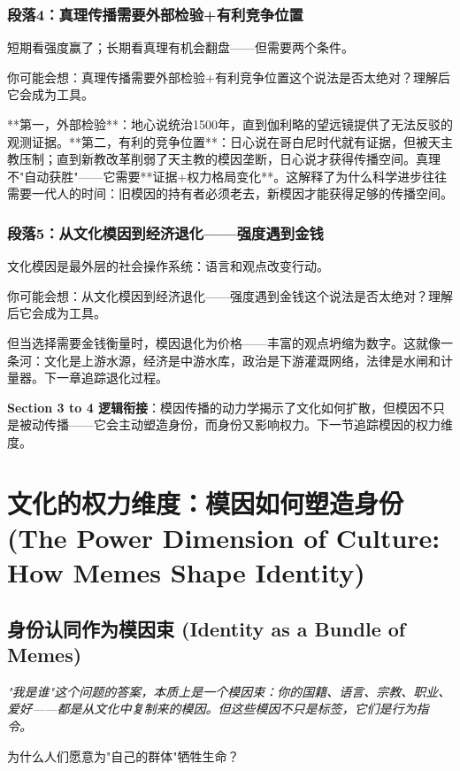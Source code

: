 \documentclass[a4paper,12pt]{book}
\newenvironment{motivation}{\begin{tcolorbox}[colback=gray!10,colframe=gray!60,title=\textit{本章动机},fonttitle=\bfseries,arc=0mm,leftrule=3mm]\small\itshape}{\end{tcolorbox}}
\newenvironment{questionbox}{\begin{tcolorbox}[colback=red!3!white,colframe=red!60!black]}{\end{tcolorbox}}
\begin{document}
\begin{motivation}
\begin{motivation}
\begin{motivation}
	\subsubsection*{段落4：真理传播需要外部检验+有利竞争位置}
	短期看强度赢了；长期看真理有机会翻盘——但需要两个条件。
	\begin{tcolorbox}[colback=yellow!5, title=\textit{读者行为预测}]
		你可能会想：真理传播需要外部检验+有利竞争位置这个说法是否太绝对？理解后它会成为工具。
	\end{tcolorbox}

**第一，外部检验**：地心说统治1500年，直到伽利略的望远镜提供了无法反驳的观测证据。**第二，有利的竞争位置**：日心说在哥白尼时代就有证据，但被天主教压制；直到新教改革削弱了天主教的模因垄断，日心说才获得传播空间。真理不"自动获胜"——它需要**证据+权力格局变化**。这解释了为什么科学进步往往需要一代人的时间：旧模因的持有者必须老去，新模因才能获得足够的传播空间。

	\subsubsection*{段落5：从文化模因到经济退化——强度遇到金钱}
	文化模因是最外层的社会操作系统：语言和观点改变行动。
	\begin{tcolorbox}[colback=yellow!5, title=\textit{读者行为预测}]
		你可能会想：从文化模因到经济退化——强度遇到金钱这个说法是否太绝对？理解后它会成为工具。
	\end{tcolorbox}

但当选择需要金钱衡量时，模因退化为价格——丰富的观点坍缩为数字。这就像一条河：文化是上游水源，经济是中游水库，政治是下游灌溉网络，法律是水闸和计量器。下一章追踪退化过程。

	\textbf{Section 3 to 4 逻辑衔接}：模因传播的动力学揭示了文化如何扩散，但模因不只是被动传播——它会主动塑造身份，而身份又影响权力。下一节追踪模因的权力维度。


	
	\section{文化的权力维度：模因如何塑造身份 (The Power Dimension of Culture: How Memes Shape Identity)}

	\subsection{身份认同作为模因束 (Identity as a Bundle of Memes)}
	\begin{motivation}
		"我是谁"这个问题的答案，本质上是一个模因束：你的国籍、语言、宗教、职业、爱好——都是从文化中复制来的模因。但这些模因不只是标签，它们是行为指令。
	\end{motivation}
	\begin{questionbox}
		为什么人们愿意为"自己的群体"牺牲生命？
	\end{questionbox}


\end{motivation}
\end{motivation}
\end{motivation}
\end{document}
